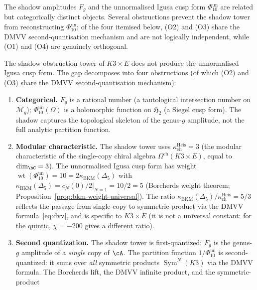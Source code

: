 The shadow amplitudes $F_g$ and the unnormalised Igusa cusp form
\(\Phi_{10}^{\mathrm{un}}\) are related but categorically distinct objects.
Several obstructions prevent the shadow tower from
reconstructing \(\Phi_{10}^{\mathrm{un}}\); of the four itemised below, (O2)
and (O3) share the DMVV second-quantisation mechanism and
are not logically independent, while (O1) and (O4) are
genuinely orthogonal.

\begin{theorem}
\label{thm:shadow-siegel-gap}
The shadow obstruction tower of $K3 \times E$ does not
produce the unnormalised Igusa cusp form. The gap decomposes into four
obstructions (of which (O2) and (O3) share the DMVV
second-quantisation mechanism):
\begin{enumerate}[label=\textup{(O\arabic*)}]
\item \textbf{Categorical.}
$F_g$ is a rational number \textup{(}a tautological
intersection number on $\overline{\mathcal{M}}_g$\textup{)};
\(\Phi_{10}^{\mathrm{un}}(\Omega)\) is a holomorphic function on
$\mathfrak{H}_2$ \textup{(}a Siegel cusp form\textup{)}.
The shadow captures the topological skeleton of the
genus-$g$ amplitude, not the full analytic partition function.
\item \textbf{Modular characteristic.}
The shadow tower uses $\kappa_{\mathrm{ch}}^{\mathrm{Heis}} = 3$ (the modular
characteristic of the single-copy chiral algebra
$\Omega^{\mathrm{ch}}(K3 \times E)$, equal to
$\dim_\bC = 3$). The unnormalised Igusa cusp form has weight
\(\operatorname{wt}(\Phi_{10}^{\mathrm{un}}) = 10 = 2\kappa_{\mathrm{BKM}}(\Delta_5)\)
with $\kappa_{\mathrm{BKM}}(\Delta_5) = \left.c_N(0)/2\right|_{N=1} = 10/2 = 5$
(Borcherds weight theorem; Proposition~\textup{\ref{prop:bkm-weight-universal}}). The ratio
$\kappa_{\mathrm{BKM}}(\Delta_5)/\kappa_{\mathrm{ch}}^{\mathrm{Heis}} = 5/3$ reflects
the passage from single-copy to symmetric-product via the
DMVV formula~\textup{\eqref{eq:dvv}}, and is specific to
$K3 \times E$ \textup{(}it is not a universal constant:
for the quintic, $\chi = -200$ gives a different ratio\textup{)}.
\item \textbf{Second quantization.}
The shadow tower is first-quantized: $F_g$ is the genus-$g$
amplitude of a \emph{single} copy of $\cA$. The partition
function \(1/\Phi_{10}^{\mathrm{un}}\) is second-quantized: it sums over
\emph{all} symmetric products $\operatorname{Sym}^N(K3)$
via the DMVV formula. The Borcherds lift,
the DMVV infinite product, and the symmetric-product

\end{enumerate}
\end{theorem}
